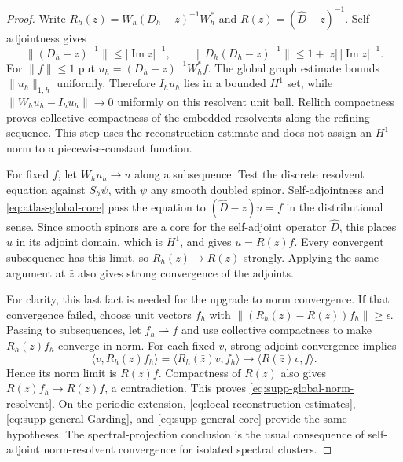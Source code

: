\documentclass[11pt]{article}
\theoremstyle{definition}
\theoremstyle{remark}
\theoremstyle{definition}
\theoremstyle{remark}
\begin{document}
\begin{proof}
Write $R_h(z)=W_h(D_h-z)^{-1}W_h^*$ and
$R(z)=(\widehat D-z)^{-1}$.  Self-adjointness gives
\begin{equation}
 \|(D_h-z)^{-1}\|\le|\operatorname{Im}z|^{-1},\qquad
 \|D_h(D_h-z)^{-1}\|\le1+|z|\,|\operatorname{Im}z|^{-1}.
 \label{eq:uniform-resolvent-bounds}
\end{equation}
For $\|f\|\le1$ put $u_h=(D_h-z)^{-1}W_h^*f$.  The global graph estimate
bounds $\|u_h\|_{1,h}$ uniformly.  Therefore $I_hu_h$ lies in a bounded
$H^1$ set, while $\|W_hu_h-I_hu_h\|\to0$ uniformly on this resolvent unit
ball.  Rellich compactness proves collective compactness of the embedded
resolvents along the refining sequence.  This step uses the reconstruction
estimate and does not assign an $H^1$ norm to a piecewise-constant function.

For fixed $f$, let $W_hu_h\to u$ along a subsequence.  Test the discrete
resolvent equation against $S_h\psi$, with $\psi$ any smooth doubled spinor.
Self-adjointness and \eqref{eq:atlas-global-core} pass the equation to
$(\widehat D-z)u=f$ in the distributional sense.  Since smooth spinors are a
core for the self-adjoint operator $\widehat D$, this places $u$ in its
adjoint domain, which is $H^1$, and gives $u=R(z)f$.  Every convergent
subsequence has this limit, so $R_h(z)\to R(z)$ strongly.  Applying the same
argument at $\bar z$ also gives strong convergence of the adjoints.

For clarity, this last fact is needed for the upgrade to norm convergence.
If that convergence failed, choose unit vectors $f_h$ with
$\|(R_h(z)-R(z))f_h\|\ge\epsilon$.  Passing to subsequences, let
$f_h\rightharpoonup f$ and use collective compactness to make $R_h(z)f_h$
converge in norm.  For each fixed $v$, strong adjoint convergence implies
\[
 \langle v,R_h(z)f_h\rangle
 =\langle R_h(\bar z)v,f_h\rangle
 \longrightarrow\langle R(\bar z)v,f\rangle.
\]
Hence its norm limit is $R(z)f$.  Compactness of $R(z)$ also gives
$R(z)f_h\to R(z)f$, a contradiction.  This proves
\eqref{eq:supp-global-norm-resolvent}.  On the periodic extension,
\eqref{eq:local-reconstruction-estimates},
\eqref{eq:supp-general-Garding}, and \eqref{eq:supp-general-core} provide the
same hypotheses.  The spectral-projection conclusion is the usual consequence
of self-adjoint norm-resolvent convergence for isolated spectral clusters.
\end{proof}
\end{document}
